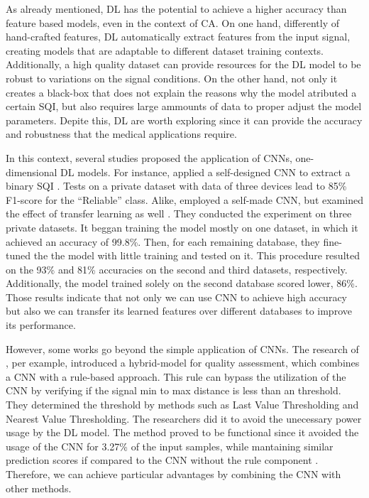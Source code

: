 As already mentioned, \gls{DL} has the potential to achieve a higher accuracy than feature based models, even in the context of \gls{CA}. On one hand, differently of hand-crafted features, \gls{DL} automatically extract features from the input signal, creating models that are adaptable to different dataset training contexts. Additionally, a high quality dataset can provide resources for the \gls{DL} model to be robust to variations on the signal conditions. On the other hand, not only it creates a black-box that does not explain the reasons why the model atributed a certain \gls{SQI}, but also requires large ammounts of data to proper adjust the model parameters. Depite this, \gls{DL} are worth exploring since it can provide the accuracy and robustness that the medical applications require. 

In this context, several studies proposed the application of \gls{CNN}s, one-dimensional \gls{DL} models. For instance, \citeauthor{review-8} applied a self-designed \gls{CNN} to extract a binary \gls{SQI} \cite{review-8}. Tests on a private dataset with data of three devices lead to 85\% F1-score for the ``Reliable'' class. Alike, \citeauthor{review-9} employed a self-made \gls{CNN}, but examined the effect of transfer learning as well \cite{review-9}. They conducted the experiment on three private datasets. It beggan training the model mostly on one dataset, in which it achieved an accuracy of 99.8\%. Then, for each remaining database, they fine-tuned the the model with little training and tested on it. This procedure resulted on the 93\% and 81\% accuracies on the second and third datasets, respectively. Additionally, the model trained solely on the second database scored lower, 86\%. Those results indicate that not only we can use \gls{CNN} to achieve high accuracy but also we can transfer its learned features over different databases to improve its performance.

However, some works go beyond the simple application of \gls{CNN}s. The research of \citeauthor{review-10}, per example, introduced a hybrid-model for quality assessment, which combines a \gls{CNN} with a rule-based approach. This rule can bypass the utilization of the \gls{CNN} by verifying if the signal min to max distance is less than an threshold. They determined the threshold by methods such as Last Value Thresholding and Nearest Value Thresholding. The researchers did it to avoid the unecessary power usage by the \gls{DL} model. The method proved to be functional since it avoided the usage of the \gls{CNN} for 3.27\% of the input samples, while mantaining similar prediction scores if compared to the \gls{CNN} without the rule component \cite{review-10}. Therefore, we can achieve particular advantages by combining the \gls{CNN} with other methods.  

